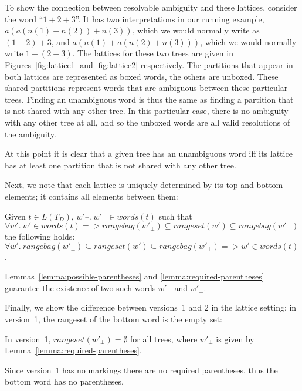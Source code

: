\documentclass[acmsmall,review,anonymous]{acmart}\settopmatter{printfolios=true,printccs=false,printacmref=false}
\newcommand{\words}{\mathit{words}} %
\newcommand{\alt}{\mathit{alt}} %
\newcommand{\rangebag}{\mathit{rangebag}} %
\newcommand{\rangeset}{\mathit{rangeset}} %
\begin{document}
To show the connection between resolvable ambiguity and these lattices, consider the word ``$1 + 2 + 3$''. It has two interpretations in our running example, $a(a(n(1)+n(2))+n(3))$, which we would normally write as $(1 + 2) + 3$, and $a(n(1)+a(n(2)+n(3)))$, which we would normally write $1 + (2 + 3)$. The lattices for these two trees are given in Figures~\ref{fig:lattice1} and \ref{fig:lattice2} respectively. The partitions that appear in both lattices are represented as boxed words, the others are unboxed. These shared partitions represent words that are ambiguous between these particular trees. Finding an unambiguous word is thus the same as finding a partition that is not shared with any other tree. In this particular case, there is no ambiguity with any other tree at all, and so the unboxed words are all valid resolutions of the ambiguity.

At this point it is clear that a given tree has an unambiguous word iff its lattice has at least one partition that is not shared with any other tree.

Next, we note that each lattice is uniquely determined by its top and bottom elements; it contains all elements between them:

\begin{lemma}
  Given $t \in L(T_D)$, $w'_\top, w'_\bot \in \words(t)$ such that $\forall w'.\ w' \in \words(t) => \rangebag(w'_\bot) \subseteq \rangeset(w') \subseteq \rangebag(w'_\top)$ the following holds:\\
  $\forall w'.\ \rangebag(w'_\bot) \subseteq \rangeset(w') \subseteq \rangebag(w'_\top) => w' \in \words(t)$. \label{lemma:top-bottom-determine}
\end{lemma}

\noindent Lemmas~\ref{lemma:possible-parentheses} and \ref{lemma:required-parentheses} guarantee the existence of two such words $w'_\top$ and $w'_\bot$.

Finally, we show the difference between versions~1 and 2 in the lattice setting: in version~1, the rangeset of the bottom word is the empty set:

\begin{lemma}
  In version~1, $rangeset(w'_\bot) = \emptyset$ for all trees, where $w'_\bot$ is given by Lemma~\ref{lemma:required-parentheses}. \label{lemma:version1-bot}
\end{lemma}

\noindent Since version~1 has no markings there are no required parentheses, thus the bottom word has no parentheses.
\end{document}

